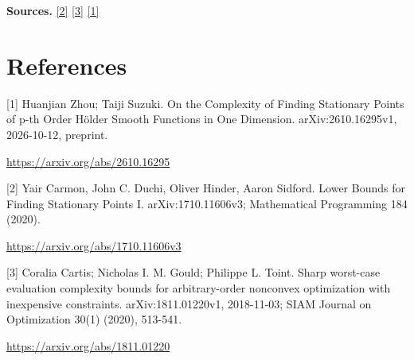 \documentclass[10pt,a4paper]{article}
\begin{document}
\textbf{Sources.} \href{https://arxiv.org/abs/1710.11606v3}{[2]} \href{https://arxiv.org/abs/1811.01220}{[3]} \href{https://arxiv.org/abs/2610.16295}{[1]}

\section{References}
[1] Huanjian Zhou; Taiji Suzuki. On the Complexity of Finding Stationary Points of p-th Order Hölder Smooth Functions in One Dimension. arXiv:2610.16295v1, 2026-10-12, preprint.

\url{https://arxiv.org/abs/2610.16295}

[2] Yair Carmon, John C. Duchi, Oliver Hinder, Aaron Sidford. Lower Bounds for Finding Stationary Points I. arXiv:1710.11606v3; Mathematical Programming 184 (2020).

\url{https://arxiv.org/abs/1710.11606v3}

[3] Coralia Cartis; Nicholas I. M. Gould; Philippe L. Toint. Sharp worst-case evaluation complexity bounds for arbitrary-order nonconvex optimization with inexpensive constraints. arXiv:1811.01220v1, 2018-11-03; SIAM Journal on Optimization 30(1) (2020), 513-541.

\url{https://arxiv.org/abs/1811.01220}
\end{document}

